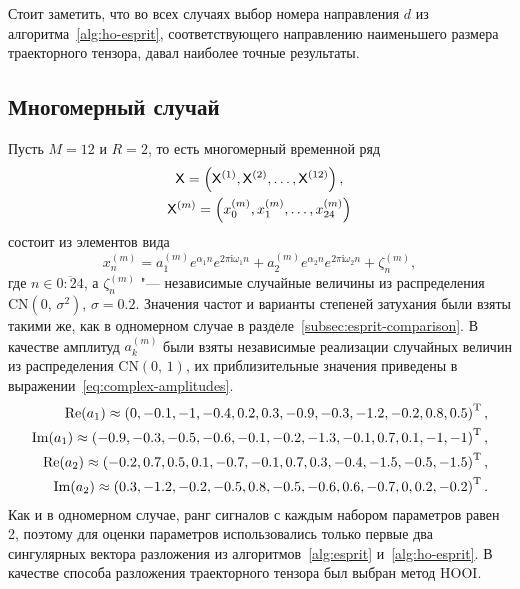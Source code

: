\documentclass[specialist,
  substylefile=spbu_report.rtx,
subf,href,colorlinks=true, 12pt]{disser}
\theoremstyle{plain}
\theoremstyle{definition}
\theoremstyle{remark}
\newcommand{\iu}{\mathrm{i}}
\begin{document}
Стоит заметить, что во всех случаях выбор номера направления $d$ из
алгоритма~\ref{alg:ho-esprit}, соответствующего направлению
наименьшего размера
траекторного тензора, давал наиболее точные результаты.

\subsection{Многомерный случай}\label{subsec:mv-esprit-comparison}
Пусть $M=12$ и $R=2$, то есть многомерный временной ряд
\begin{gather*}
  \mathsf{X} = \left(\mathsf{X}^{(1)}, \mathsf{X}^{(2)}, \ldots, \mathsf{X}^{(12)}\right),\\
  \mathsf{X}^{(m)} = \left(x_0^{(m)}, x_1^{(m)}, \ldots, x_{24}^{(m)}\right)
\end{gather*}
состоит из элементов вида
\[
  x_n^{(m)} = a_1^{(m)} e^{ \alpha_1 n }
  e^{2 \pi \iu \omega_1 n} +
  a_2^{(m)} e^{ \alpha_2 n }
  e^{2 \pi \iu \omega_2 n} + \zeta_n^{(m)},
\]
где $n \in \overline{0:24}$, а $\zeta_n^{(m)}$ "--- независимые
случайные величины из
распределения $\mathrm{CN}(0,\, \sigma^2)$, $\sigma=0.2$.
Значения частот и варианты степеней затухания были взяты такими же, как
в одномерном случае в разделе~\ref{subsec:esprit-comparison}.
В качестве амплитуд $a_k^{(m)}$ были взяты независимые реализации
случайных величин из распределения $\mathrm{CN}(0,\, 1)$,
их приблизительные значения приведены в
выражении~\eqref{eq:complex-amplitudes}.
\begin{gather}
  \label{eq:complex-amplitudes}
  \begin{split}
    \operatorname{Re}(a_1) \approx \left( 0, -0.1, -1, -0.4, 0.2,
    0.3, -0.9, -0.3, -1.2, -0.2, 0.8, 0.5\right)^{\mathrm{T}}, \\
    \operatorname{Im}(a_1) \approx \left(-0.9, -0.3, -0.5, -0.6,
    -0.1, -0.2, -1.3, -0.1, 0.7, 0.1, -1, -1 \right)^{\mathrm{T}}, \\
    \operatorname{Re}(a_2) \approx \left( -0.2, 0.7, 0.5, 0.1, -0.7,
    -0.1, 0.7, 0.3, -0.4, -1.5, -0.5, -1.5\right)^{\mathrm{T}}, \\
    \operatorname{Im}(a_2) \approx \left( 0.3, -1.2, -0.2, -0.5, 0.8,
    -0.5, -0.6, 0.6, -0.7, 0, 0.2, -0.2\right)^{\mathrm{T}}. \\
  \end{split}
\end{gather}
Как и в одномерном случае, ранг сигналов с каждым набором параметров равен 2,
поэтому для оценки параметров использовались только первые два
сингулярных вектора разложения из алгоритмов~\ref{alg:esprit}
и~\ref{alg:ho-esprit}.
В качестве способа разложения траекторного тензора был выбран метод HOOI.
\end{document}
